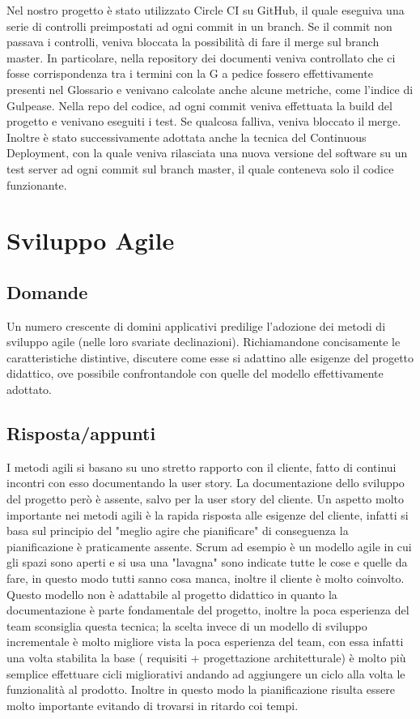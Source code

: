 Nel nostro progetto è stato utilizzato Circle CI su GitHub, il quale eseguiva una serie di controlli preimpostati ad ogni commit in un branch. Se il commit non passava i controlli, veniva bloccata la possibilità di fare il merge sul branch master. In particolare, nella repository dei documenti veniva controllato che ci fosse corrispondenza tra i termini con la G a pedice fossero effettivamente presenti nel Glossario e venivano calcolate anche alcune metriche, come l'indice di Gulpease.
Nella repo del codice, ad ogni commit veniva effettuata la build del progetto e venivano eseguiti i test. Se qualcosa falliva, veniva bloccato il merge.
Inoltre è stato successivamente adottata anche la tecnica del Continuous Deployment, con la quale veniva rilasciata una nuova versione del software su un test server ad ogni commit sul branch master, il quale conteneva solo il codice funzionante.

\section{Sviluppo Agile}

\subsection*{Domande}
Un numero crescente di domini applicativi predilige l'adozione dei metodi di sviluppo agile (nelle loro svariate declinazioni). Richiamandone concisamente le caratteristiche distintive, discutere come esse si adattino alle esigenze del progetto didattico, ove possibile confrontandole con quelle del modello effettivamente adottato.

\subsection*{Risposta/appunti}
I metodi agili si basano su uno stretto rapporto con il cliente, fatto di continui incontri con esso documentando la user
story. La documentazione dello sviluppo del progetto però è assente, salvo per la user story del cliente.
Un aspetto molto importante nei metodi agili è la rapida risposta alle esigenze del cliente, infatti si basa sul principio del
"meglio agire che pianificare" di conseguenza la pianificazione è praticamente assente. Scrum ad esempio è un modello
agile in cui gli spazi sono aperti e si usa una "lavagna" sono indicate tutte le cose e quelle da fare, in questo modo tutti
sanno cosa manca, inoltre il cliente è molto coinvolto.
Questo modello non è adattabile al progetto didattico in quanto la documentazione è parte fondamentale del progetto,
inoltre la poca esperienza del team sconsiglia questa tecnica; la scelta invece di un modello di sviluppo incrementale è
molto migliore vista la poca esperienza del team, con essa infatti una volta stabilita la base ( requisiti + progettazione
architetturale) è molto più semplice effettuare cicli migliorativi andando ad aggiungere un ciclo alla volta le funzionalità
al prodotto. Inoltre in questo modo la pianificazione risulta essere molto importante evitando di trovarsi in ritardo coi
tempi.\\


